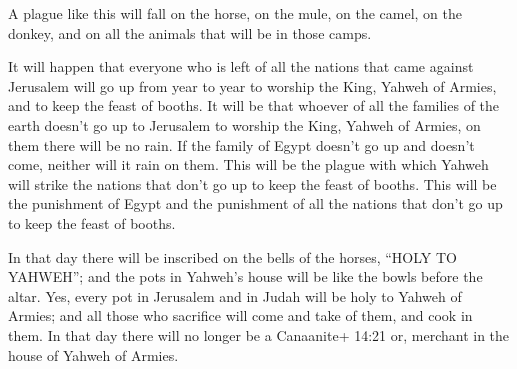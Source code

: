  A plague like this will fall on the horse, on the mule, on
the camel, on the donkey, and on all the animals that will be in those
camps.

 It will happen that everyone who is left of all the
nations that came against Jerusalem will go up from year to year to
worship the King, Yahweh of Armies, and to keep the feast of booths.
 It will be that whoever of all the families of the earth
doesn't go up to Jerusalem to worship the King, Yahweh of Armies, on
them there will be no rain.  If the family of Egypt doesn't
go up and doesn't come, neither will it rain on them. This will be the
plague with which Yahweh will strike the nations that don't go up to
keep the feast of booths.  This will be the punishment of
Egypt and the punishment of all the nations that don't go up to keep the
feast of booths.

 In that day there will be inscribed on the bells of the
horses, ``HOLY TO YAHWEH''; and the pots in Yahweh's house will be like
the bowls before the altar.  Yes, every pot in Jerusalem
and in Judah will be holy to Yahweh of Armies; and all those who
sacrifice will come and take of them, and cook in them. In that day
there will no longer be a Canaanite+ 14:21 or, merchant in the house of
Yahweh of Armies.
